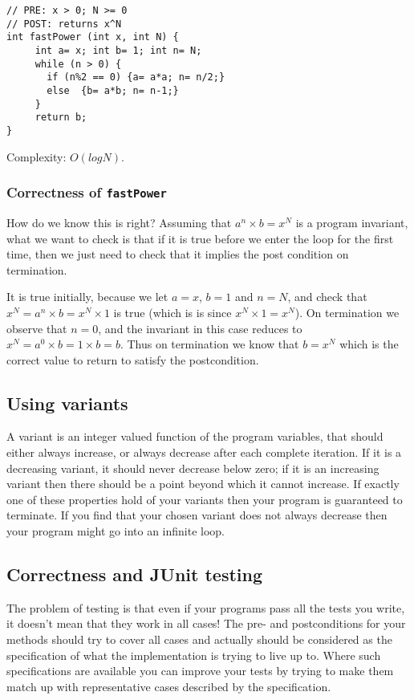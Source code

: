 \documentclass[twoside=false,DIV=14]{scrartcl}
\begin{document}
\begin{itemize}
\begin{verbatim}
// PRE: x > 0; N >= 0
// POST: returns x^N
int fastPower (int x, int N) {
     int a= x; int b= 1; int n= N;
     while (n > 0) {
       if (n%2 == 0) {a= a*a; n= n/2;}
       else  {b= a*b; n= n-1;}
     }
     return b;
}
\end{verbatim}

Complexity: $O(log N)$.

\subsubsection*{Correctness of {\tt fastPower}}

How do we know this is right? Assuming that $a^n \times b = x^N$ is a program invariant, what we want to check is that if it is true before we enter the loop for the first time, then we just need to check that it implies the post condition on termination.

It is true initially, because we let $a=x$, $b=1$ and $n=N$, and check that $x^N = a^n\times b = x^N \times 1$ is true (which is is since  $x^N \times 1= x^N$). On termination we observe that $n=0$, and the invariant in this case reduces to $x^N = a^0 \times b = 1\times b= b $. Thus on termination we know that $b= x^N$ which is the correct value to return to satisfy the postcondition.  


\subsection*{Using variants} 
A variant is an integer valued function of the program variables, that should either always increase, or always decrease after each complete iteration. If it is a decreasing variant, it should never decrease below zero; if it is an increasing variant then there should be a point beyond which it cannot increase. If exactly one of these properties hold of your variants then your program is guaranteed to terminate. If you find that your chosen variant does not always decrease then your program might go into an infinite loop. 




\subsection*{Correctness and JUnit testing}

The problem of testing is that even if your programs pass all the tests you write, it doesn't mean that they work in all cases! The pre- and postconditions for your methods should try to cover all cases and actually should be considered as the specification of what the implementation is trying to live up to. Where such specifications are available you can improve your tests by trying to make them match up with representative cases described by the specification.


\end{itemize}
\end{document}
